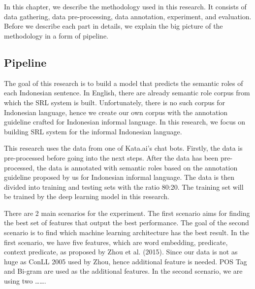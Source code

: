 \chapter{\babTiga}\label{bab:tiga}
In this chapter, we describe the methodology used in this research. It consists of data gathering, data pre-processing, data annotation, experiment, and evaluation. Before we describe each part in details, we explain the big picture of the methodology in a form of pipeline.

\section{Pipeline}

The goal of this research is to build a model that predicts the semantic roles of each Indonesian sentence. In English, there are already semantic role corpus from which the SRL system is built. Unfortunately, there is no such corpus for Indonesian language, hence we create our own corpus with the annotation guideline crafted for Indonesian informal language. In this research, we focus on building SRL system for the informal Indonesian language.

This research uses the data from one of Kata.ai’s chat bots. Firstly, the data is pre-processed before going into the next steps. After the data has been pre-processed, the data is annotated with semantic roles based on the annotation guideline proposed by us for Indonesian informal language. The data is then divided into training and testing sets with the ratio 80:20. The training set will be trained by the deep learning model in this research. 

There are 2 main scenarios for the experiment. The first scenario aims for finding the best set of features that output the best performance. The goal of the second scenario is to find which machine learning architecture has the best result. In the first scenario, we have five features, which are word embedding, predicate, context predicate, as proposed by Zhou et al. (2015). Since our data is not as huge as ConLL 2005 used by Zhou, hence additional feature is needed. POS Tag and Bi-gram are used as the additional features. In the second scenario, we are using two …….

